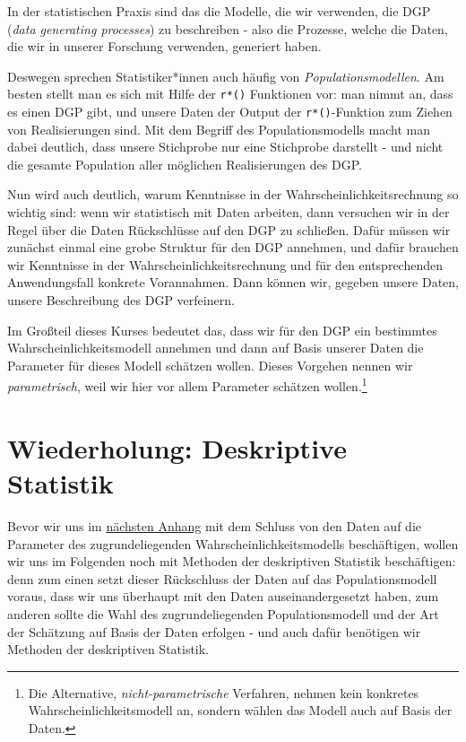 \documentclass[]{book}
\let\rmarkdownfootnote\footnote%
\def\footnote{\protect\rmarkdownfootnote}
\begin{document}
In der statistischen Praxis sind das die Modelle, die wir verwenden, die
DGP (\emph{data generating processes}) zu beschreiben - also die
Prozesse, welche die Daten, die wir in unserer Forschung verwenden,
generiert haben.

Deswegen sprechen Statistiker*innen auch häufig von
\emph{Populationsmodellen}. Am besten stellt man es sich mit Hilfe der
\texttt{r*()} Funktionen vor: man nimmt an, dass es einen DGP gibt, und
unsere Daten der Output der \texttt{r*()}-Funktion zum Ziehen von
Realisierungen sind. Mit dem Begriff des Populationsmodells macht man
dabei deutlich, dass unsere Stichprobe nur eine Stichprobe darstellt -
und nicht die gesamte Population aller möglichen Realisierungen des DGP.

Nun wird auch deutlich, warum Kenntnisse in der
Wahrscheinlichkeitsrechnung so wichtig sind: wenn wir statistisch mit
Daten arbeiten, dann versuchen wir in der Regel über die Daten
Rückschlüsse auf den DGP zu schließen. Dafür müssen wir zunächst einmal
eine grobe Struktur für den DGP annehmen, und dafür brauchen wir
Kenntnisse in der Wahrscheinlichkeitsrechnung und für den entsprechenden
Anwendungsfall konkrete Vorannahmen. Dann können wir, gegeben unsere
Daten, unsere Beschreibung des DGP verfeinern.

Im Großteil dieses Kurses bedeutet das, dass wir für den DGP ein
bestimmtes Wahrscheinlichkeitsmodell annehmen und dann auf Basis unserer
Daten die Parameter für dieses Modell schätzen wollen. Dieses Vorgehen
nennen wir \emph{parametrisch}, weil wir hier vor allem Parameter
schätzen wollen.\footnote{Die Alternative, \emph{nicht-parametrische}
  Verfahren, nehmen kein konkretes Wahrscheinlichkeitsmodell an, sondern
  wählen das Modell auch auf Basis der Daten.}

\hypertarget{desk-stat}{\chapter{Wiederholung: Deskriptive
Statistik}\label{desk-stat}}

Bevor wir uns im \protect\hyperlink{stat-rep}{nächsten Anhang} mit dem
Schluss von den Daten auf die Parameter des zugrundeliegenden
Wahrscheinlichkeitsmodells beschäftigen, wollen wir uns im Folgenden
noch mit Methoden der deskriptiven Statistik beschäftigen: denn zum
einen setzt dieser Rückschluss der Daten auf das Populationsmodell
voraus, dass wir uns überhaupt mit den Daten auseinandergesetzt haben,
zum anderen sollte die Wahl des zugrundeliegenden Populationsmodell und
der Art der Schätzung auf Basis der Daten erfolgen - und auch dafür
benötigen wir Methoden der deskriptiven Statistik.
\end{document}
